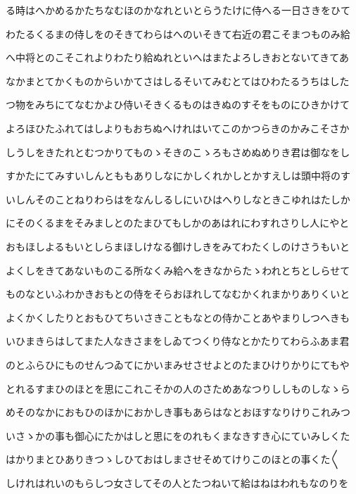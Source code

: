 \documentclass[a4paper,11pt,landscape]{ltjtarticle}
\begin{document}
\par\medskip
る時はへかめるかたちなむほのかなれといとらうたけに侍へる一日さきをひて
\par\medskip
わたるくるまの侍しをのそきてわらはへのいそきて右近の君こそまつものみ給
\par\medskip
へ中将とのこそこれよりわたり給ぬれといへはまたよろしきおとないてきてあ
\par\medskip
なかまとてかくものからいかてさはしるそいてみむとてはひわたるうちはした
\par\medskip
つ物をみちにてなむかよひ侍いそきくるものはきぬのすそをものにひきかけて
\par\medskip
よろほひたふれてはしよりもおちぬへけれはいてこのかつらきのかみこそさか
\par\medskip
しうしをきたれとむつかりてものゝそきのこゝろもさめぬめりき君は御なをし
\par\medskip
すかたにてみすいしんとももありしなにかしくれかしとかすえしは頭中将のす
\par\medskip
いしんそのことねりわらはをなんしるしにいひはへりしなときこゆれはたしか
\par\medskip
にそのくるまをそみましとのたまひてもしかのあはれにわすれさりし人にやと
\par\medskip
おもほしよるもいとしらまほしけなる御けしきをみてわたくしのけさうもいと
\par\medskip
よくしをきてあないものこる所なくみ給へをきなからたゝわれとちとしらせて
\par\medskip
ものなといふわかきおもとの侍をそらおほれしてなむかくれまかりありくいと
\par\medskip
よくかくしたりとおもひてちいさきこともなとの侍かことあやまりしつへきも
\par\medskip
いひまきらはしてまた人なきさまをしゐてつくり侍なとかたりてわらふあま君
\par\medskip
のとふらひにものせんつゐてにかいまみせさせよとのたまひけりかりにてもや
\par\medskip
とれるすまひのほとを思にこれこそかの人のさためあなつりししものしなゝら
\par\medskip
めそのなかにおもひのほかにおかしき事もあらはなとおほすなりけりこれみつ
\par\medskip
いさゝかの事も御心にたかはしと思にをのれもくまなきすき心にていみしくた
\par\medskip
はかりまとひありきつゝしひておはしまさせそめてけりこのほとの事くた〱
\par\medskip
しけれはれいのもらしつ女さしてその人とたつねいて給はねはわれもなのりを
\end{document}
